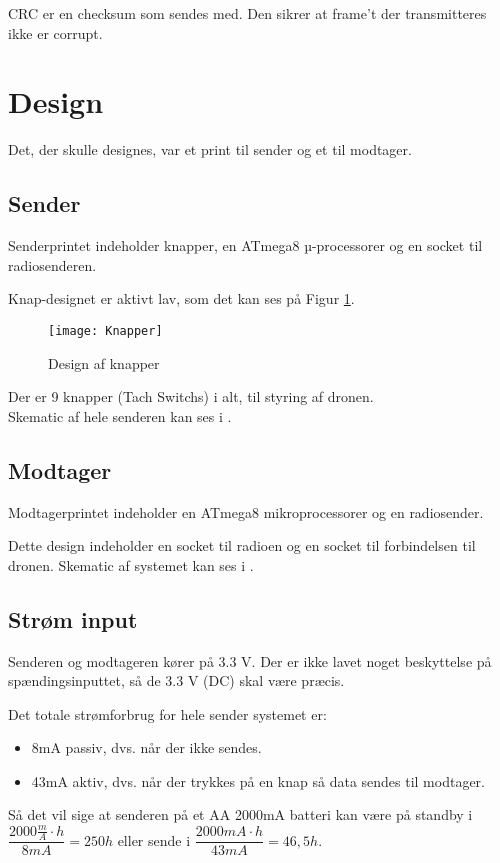 \documentclass[Main]{subfiles}
\begin{document}
CRC er en checksum som sendes med. 
Den sikrer at frame't der transmitteres ikke er corrupt.



\section{Design}
Det, der skulle designes, var et print til sender og et til modtager.

\subsection{Sender}
Senderprintet indeholder knapper, en ATmega8 µ-processorer og en socket til radiosenderen.

Knap-designet er aktivt lav, som det kan ses på Figur \ref{fig: Knapper}.


\begin{figure}[H]
\centering
\texttt{[image: Knapper]}
\caption{Design af knapper}
\label{fig: Knapper}
\end{figure}

Der er 9 knapper (Tach Switchs) i alt, til styring af dronen.\\
Skematic af hele senderen kan ses i \cite{SenderSCM}.
\subsection{Modtager}
Modtagerprintet indeholder en ATmega8 mikroprocessorer og en radiosender.

Dette design indeholder en socket til radioen og en socket til \itoc forbindelsen til dronen.
Skematic af systemet kan ses i \cite{ModtagerSCM}.


\subsection{Strøm input}

Senderen og modtageren kører på 3.3 V.
Der er ikke lavet noget beskyttelse på spændingsinputtet, så de 3.3 V (DC) skal være præcis.

Det totale strømforbrug for hele sender systemet er:
\begin{itemize}
\item 8mA passiv, dvs. når der ikke sendes.
\item 43mA aktiv, dvs. når der trykkes på en knap så data sendes til modtager.
\end{itemize}

Så det vil sige at senderen på et AA 2000mA batteri kan være på standby i $\dfrac{2000 \frac mA\cdot h}{8 mA} = 250 h$ eller sende i $\dfrac{2000 mA \cdot h}{43 mA} = 46,5 h$.
\end{document}
